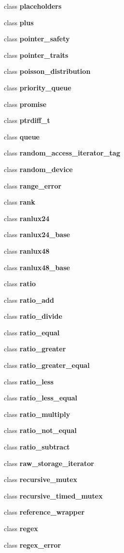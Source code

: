 \begin{DoxyCompactItemize}
\item 
class {\bf placeholders}
\item 
class {\bf plus}
\item 
class {\bf pointer\+\_\+safety}
\item 
class {\bf pointer\+\_\+traits}
\item 
class {\bf poisson\+\_\+distribution}
\item 
class {\bf priority\+\_\+queue}
\item 
class {\bf promise}
\item 
class {\bf ptrdiff\+\_\+t}
\item 
class {\bf queue}
\item 
class {\bf random\+\_\+access\+\_\+iterator\+\_\+tag}
\item 
class {\bf random\+\_\+device}
\item 
class {\bf range\+\_\+error}
\item 
class {\bf rank}
\item 
class {\bf ranlux24}
\item 
class {\bf ranlux24\+\_\+base}
\item 
class {\bf ranlux48}
\item 
class {\bf ranlux48\+\_\+base}
\item 
class {\bf ratio}
\item 
class {\bf ratio\+\_\+add}
\item 
class {\bf ratio\+\_\+divide}
\item 
class {\bf ratio\+\_\+equal}
\item 
class {\bf ratio\+\_\+greater}
\item 
class {\bf ratio\+\_\+greater\+\_\+equal}
\item 
class {\bf ratio\+\_\+less}
\item 
class {\bf ratio\+\_\+less\+\_\+equal}
\item 
class {\bf ratio\+\_\+multiply}
\item 
class {\bf ratio\+\_\+not\+\_\+equal}
\item 
class {\bf ratio\+\_\+subtract}
\item 
class {\bf raw\+\_\+storage\+\_\+iterator}
\item 
class {\bf recursive\+\_\+mutex}
\item 
class {\bf recursive\+\_\+timed\+\_\+mutex}
\item 
class {\bf reference\+\_\+wrapper}
\item 
class {\bf regex}
\item 
class {\bf regex\+\_\+error}

\end{DoxyCompactItemize}

